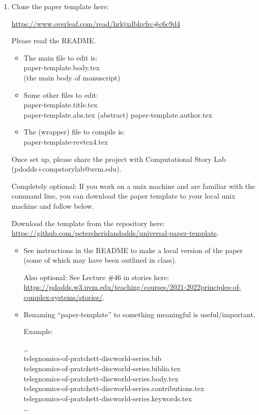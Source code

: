 \begin{enumerate}
\item
  Clone the paper template here:

  \url{https://www.overleaf.com/read/hrkjxdbhvfrc\#c6c9d4}

  Please read the README.

  \begin{itemize}
  \item 
    The main file to edit is:\\
    paper-template.body.tex\\
    (the main body of manuscript)
  \item
    Some other files to edit:\\
    paper-template.title.tex\\
    paper-template.abs.tex (abstract)
    paper-template.author.tex\\
  \item
    The (wrapper) file to compile is:\\
    paper-template-revtex4.tex
  \end{itemize}

  Once set up, please 
  share the project with Computational Story Lab (pdodds+compstorylab@uvm.edu).

  Completely optional: If you work on a unix machine and are familiar with
  the command line, you can download the paper template to your local unix machine
  and follow below.

  Download the template from the repository here:\\
  \url{https://github.com/petersheridandodds/universal-paper-template}.

  \begin{itemize}
  \item 
    See instructions in the README to make a
    local version of the paper
    (some of which may have been outlined in class).

    Also optional: See Lecture \#46 in stories here:
    \url{https://pdodds.w3.uvm.edu/teaching/courses/2021-2022principles-of-complex-systems/stories/}.
  \item
    Renaming ``paper-template'' to something meaningful is useful/important.

    Example:

    \ldots\\
    telegnomics-of-pratchett-discworld-series.bib\\
    telegnomics-of-pratchett-discworld-series.biblio.tex\\
    telegnomics-of-pratchett-discworld-series.body.tex\\
    telegnomics-of-pratchett-discworld-series.contributions.tex\\
    telegnomics-of-pratchett-discworld-series.keywords.tex\\
    \ldots\\


\end{itemize}
\end{enumerate}
